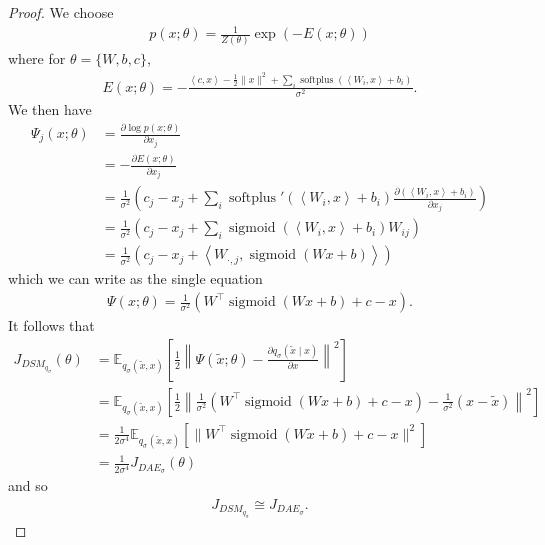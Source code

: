 \documentclass[10pt]{article}
\newcommand{\EE}{\mathbb{E}}
\newcommand{\inner}[2]{\left\langle #1, #2 \right\rangle}
\newcommand{\DAE}{J_{DAE_\sigma}}
\newcommand{\DSM}{J_{DSM_{q_\sigma}}}
\DeclareMathOperator{\sigmoid}{sigmoid}
\DeclareMathOperator{\softplus}{softplus}
\begin{document}
\begin{proof}
We choose
\begin{align*}
p(x;\theta) = \frac{1}{Z(\theta)} \exp(-E(x;\theta))
\end{align*}
where for $\theta = \{W,b,c\}$,
\begin{align*}
E(x;\theta) = - \frac{\inner{c}{x} - \frac{1}{2} \|x\|^2 + \sum_i \softplus(\inner{W_i}{x} + b_i)}{\sigma^2}.
\end{align*}
We then have
\begin{align*}
\Psi_j(x;\theta) &= \frac{\partial \log p(x;\theta)}{\partial x_j} \\
&= - \frac{\partial E(x;\theta)}{\partial x_j} \\
&= \frac{1}{\sigma^2} \left( c_j - x_j + \sum_i \softplus'(\inner{W_i}{x} + b_i) \frac{\partial (\inner{W_i}{x} + b_i)}{\partial x_j} \right) \\
&= \frac{1}{\sigma^2} \left( c_j - x_j + \sum_i \sigmoid(\inner{W_i}{x} + b_i) W_{ij} \right) \\
&= \frac{1}{\sigma^2} (c_j - x_j + \inner{W_{\cdot,j}}{\sigmoid(Wx + b)})
\end{align*}
which we can write as the single equation
\begin{align*}
\Psi(x;\theta) = \frac{1}{\sigma^2}(W^\top \sigmoid(Wx + b) + c - x).
\end{align*}
It follows that
\begin{align*}
\DSM(\theta) &= \EE_{q_\sigma(\tilde{x},x)} \left[ \frac{1}{2} \left\| \Psi(\tilde{x};\theta) - \frac{\partial q_\sigma(\tilde{x} \mid x)}{\partial x} \right\|^2 \right] \\
&= \EE_{q_\sigma(\tilde{x},x)} \left[ \frac{1}{2} \left\| \frac{1}{\sigma^2}(W^\top \sigmoid(Wx + b) + c - x) - \frac{1}{\sigma^2} (x - \tilde{x}) \right\|^2 \right] \\
&= \frac{1}{2\sigma^4} \EE_{q_\sigma(\tilde{x},x)} \left[ \|W^\top \sigmoid(W\tilde{x} + b) + c - x \|^2 \right] \\
&= \frac{1}{2\sigma^4} \DAE(\theta)
\end{align*}
and so
\begin{align*}
\DSM \cong \DAE.
\end{align*}
\end{proof}
\end{document}
